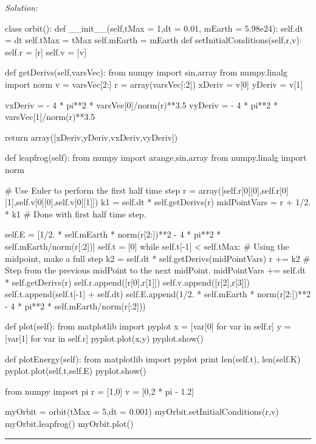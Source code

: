 \ifsolutions
\textit{Solution:}\\
\begin{codeexample}
\begin{VerbatimOut}{\listingFile}
class orbit():
    def __init__(self,tMax = 1,dt = 0.01, mEarth = 5.98e24):
        self.dt = dt
        self.tMax = tMax
        self.mEarth = mEarth
    def setInitialConditions(self,r,v):
        self.r = [r]
        self.v = [v]


    def getDerivs(self,varsVec):
        from numpy import sin,array
        from numpy.linalg import norm
        v = varsVec[2:]
        r = array(varsVec[:2])
        xDeriv = v[0]
        yDeriv = v[1]

        vxDeriv = - 4 * pi**2 * varsVec[0]/norm(r)**3.5
        vyDeriv = - 4 * pi**2 * varsVec[1]/norm(r)**3.5

        return array([xDeriv,yDeriv,vxDeriv,vyDeriv])

    def leapfrog(self):
        from numpy import arange,sin,array
        from numpy.linalg import norm

        # Use Euler to perform the first half time step
        r = array([self.r[0][0],self.r[0][1],self.v[0][0],self.v[0][1]])
        k1 = self.dt * self.getDerivs(r)
        midPointVars = r + 1/2. * k1
        # Done with first half time step.
        
        self.E = [1/2. * self.mEarth * norm(r[2:])**2 - 4 * pi**2 * self.mEarth/norm(r[:2])]
        self.t = [0]
        while self.t[-1] < self.tMax:
            # Using the midpoint, make a full step
            k2 = self.dt * self.getDerivs(midPointVars)
            r += k2
            # Step from the previous midPoint to the next midPoint.
            midPointVars +=  self.dt * self.getDerivs(r)
            self.r.append([r[0],r[1]])
            self.v.append([r[2],r[3]])
            self.t.append(self.t[-1] + self.dt)
            self.E.append(1/2. * self.mEarth * norm(r[2:])**2 - 4 * pi**2 * self.mEarth/norm(r[:2]))


    def plot(self):
        from matplotlib import pyplot
        x = [var[0] for var in self.r]
        y = [var[1] for var in self.r]
        pyplot.plot(x,y)
        pyplot.show()

    def plotEnergy(self):
        from matplotlib import pyplot
        print len(self.t), len(self.K)
        pyplot.plot(self.t,self.E)
        pyplot.show()

from numpy import pi
r = [1,0]
v = [0,2 * pi - 1.2]

myOrbit = orbit(tMax = 5,dt = 0.001)
myOrbit.setInitialConditions(r,v)
myOrbit.leapfrog()
myOrbit.plot()
\end{VerbatimOut}
\end{codeexample}
\else
\noindent\rule{4 in}{0.01 in}
\fi


